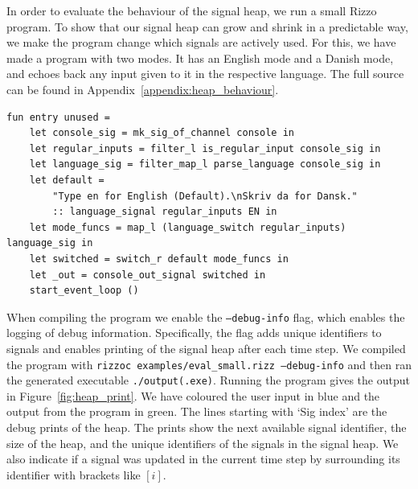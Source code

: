 In order to evaluate the behaviour of the signal heap, we run a small Rizzo program. To show that our signal heap can grow and shrink in a predictable way, we make the program change which signals are actively used. For this, we have made a program with two modes. It has an English mode and a Danish mode, and echoes back any input given to it in the respective language. 
The full source can be found in Appendix~\ref{appendix:heap_behaviour}.

\begin{lstlisting}[caption={The entry point of the Rizzo program used to evaluate the heap behaviour.}]
fun entry unused =
    let console_sig = mk_sig_of_channel console in
    let regular_inputs = filter_l is_regular_input console_sig in
    let language_sig = filter_map_l parse_language console_sig in
    let default = 
        "Type en for English (Default).\nSkriv da for Dansk." 
        :: language_signal regular_inputs EN in
    let mode_funcs = map_l (language_switch regular_inputs) language_sig in
    let switched = switch_r default mode_funcs in
    let _out = console_out_signal switched in
    start_event_loop ()
\end{lstlisting}

When compiling the program we enable the \texttt{--debug-info} flag, which enables the logging of debug information. Specifically, the flag adds unique identifiers to signals and enables printing of the signal heap after each time step.
We compiled the program with \texttt{rizzoc examples/eval\_small.rizz --debug-info} and then ran the generated executable \texttt{./output(.exe)}.
Running the program gives the output in Figure~\ref{fig:heap_print}. We have coloured the user input in blue and the output from the program in green. The lines starting with `Sig index' are the debug prints of the heap. 
The prints show the next available signal identifier, the size of the heap, and the unique identifiers of the signals in the signal heap.
We also indicate if a signal was updated in the current time step by surrounding its identifier with brackets like $[i]$.


